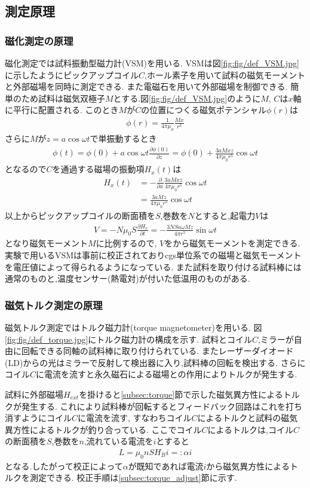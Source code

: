 \subsection{測定原理}
\subsubsection{磁化測定の原理}
磁化測定では試料振動型磁力計(VSM)を用いる.
VSMは図\ref{fig:fig/def_VSM.jpg}に示したようにピックアップコイル$C$,ホール素子を用いて試料の磁気モーメントと外部磁場を同時に測定できる.
また電磁石を用いて外部磁場を制御できる.
簡単のため試料は磁気双極子$M$とする.図\ref{fig:fig/def_VSM.jpg}のように$M$, $C$は$x$軸に平行に配置される.
このとき$M$が$C$の位置につくる磁気ポテンシャル$\phi(r)$は
\begin{align}
  \phi(r)=\frac{1}{4\pi\mu_0}\frac{Mx}{r^3}
\end{align}
さらに$M$が$z=a\cos\omega t$で単振動するとき
\begin{align}
  \phi(t)=\phi(0)+a\cos\omega t\frac{\partial\phi(0)}{\partial z}=\phi(0)+\frac{3aMxz}{4\pi\mu_0r^5}\cos\omega t
\end{align}
となるので$C$を通過する磁場の振動項$H_x(t)$は
\begin{align}
  H_x(t)&=-\frac{\partial}{\partial x}\frac{3aMxz}{4\pi\mu_0r^5}\cos\omega t\nonumber\\
  &=\frac{3aMz}{4\pi\mu_0r^5}\cos\omega t
\end{align}
以上からピックアップコイルの断面積を$S$,巻数を$N$とすると,起電力$V$は
\begin{align}
  V=-N\mu_0S\frac{\partial H_x}{\partial t}=-\frac{3NSa\omega Mz}{4\pi r^5}\sin\omega t
\end{align}
となり磁気モーメント$M$に比例するので, $V$をから磁気モーメントを測定できる.
実験で用いるVSMは事前に校正されておりcgs単位系での磁場と磁気モーメントを電圧値によって得られるようになっている.
また試料を取り付ける試料棒には通常のものと,温度センサー(熱電対)が付いた低温用のものがある.
\subsubsection{磁気トルク測定の原理}
磁気トルク測定ではトルク磁力計(torque magnetometer)を用いる.
図\ref{fig:fig/def_torque.jpg}にトルク磁力計の構成を示す.
試料とコイル$C$,ミラーが自由に回転できる同軸の試料棒に取り付けられている.
またレーザーダイオード(LD)からの光はミラーで反射して検出器に入り,試料棒の回転を検出する.
さらにコイル$C$に電流を流すと永久磁石による磁場との作用によりトルクが発生する.

試料に外部磁場$H_{ext}$を掛けると\ref{subsec:torque}節で示した磁気異方性によるトルクが発生する.
これにより試料棒が回転するとフィードバック回路はこれを打ち消すようにコイル$C$に電流を流す,
すなわちコイル$C$によるトルクと試料の磁気異方性によるトルクが釣り合っている.
ここでコイル$C$によるトルクは,コイル$C$の断面積を$S$,巻数を$n$,流れている電流を$i$とすると
\begin{align}
  \label{equ:def_alpha}
  L=\mu_0nSH_Bi=:\alpha i
\end{align}
となる.したがって校正によって$\alpha$が既知であれば電流$i$から磁気異方性によるトルクを測定できる.
校正手順は\ref{subsec:torque_adjust}節に示す.
